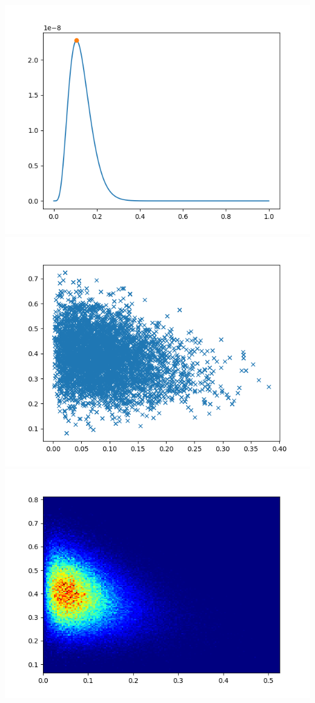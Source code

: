 \documentclass[pt12]{article}
\begin{document}
\newpage

\begin{center}
\includegraphics[scale=0.5]{hip7.png}\\
\includegraphics[scale=0.5]{sc7.png}\\
\includegraphics[scale=0.5]{den7.png}\\
\end{center}
\end{document}
